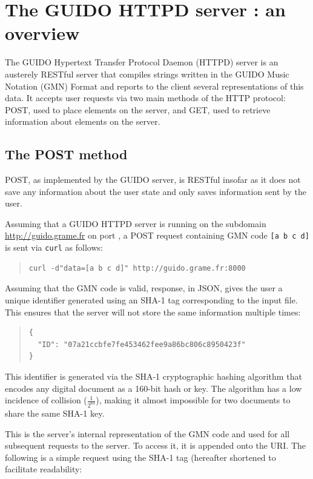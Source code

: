 \documentclass[11pt,a4paper]{article}
\newcommand{\verburl}[1]{
\begin{quote}
\begingroup
\fontsize{7.5pt}{12pt}\selectfont
#1
\endgroup
\end{quote}
}
\newcommand{\guidosize}{7pt}
\begin{document}
\section{The GUIDO HTTPD server : an overview}\label{section:overview}
The GUIDO Hypertext Transfer Protocol Daemon (HTTPD) server is an austerely RESTful server that compiles strings written in the GUIDO Music Notation (GMN) Format and reports to the client several representations of this data.  It accepts user requests via two main methods of the HTTP protocol: POST, used to place elements on the server, and GET, used to retrieve information about elements on the server.
\subsection{The POST method}\label{subsection:post}
POST, as implemented by the GUIDO server, is RESTful insofar as it does not save any information about the user state and only saves information sent by the user.\par
Assuming that a GUIDO HTTPD server is running on the subdomain \url{http://guido.grame.fr} on port , a POST request containing GMN code \verb=[a b c d]= is sent via \verb=curl= as follows:
\begin{quote}
\begingroup
\fontsize{\guidosize}{12pt}\selectfont
\begin{verbatim}
curl -d"data=[a b c d]" http://guido.grame.fr:8000
\end{verbatim}
\endgroup
\end{quote}
Assuming that the GMN code is valid, response, in JSON, gives the user a unique identifier generated using an SHA-1 tag corresponding to the input file.  This ensures that the server will not store the same information multiple times:
\begin{quote}
\begingroup
\fontsize{\guidosize}{12pt}\selectfont
\begin{verbatim}
{
  "ID": "07a21ccbfe7fe453462fee9a86bc806c8950423f"
}
\end{verbatim}
\endgroup
\end{quote}
This identifier is generated via the SHA-1 cryptographic hashing algorithm \cite{sha1} that encodes any digital document as a 160-bit hash or key.  The algorithm has a low incidence of collision ($\frac{1}{2^{63}}$), making it almost impossible for two documents to share the same SHA-1 key.\par
This is the server's internal representation of the GMN code and used for all subsequent requests to the server.  To access it, it is appended onto the URI.  The following is a simple request using the SHA-1 tag (hereafter shortened to facilitate readability:
\end{document}
